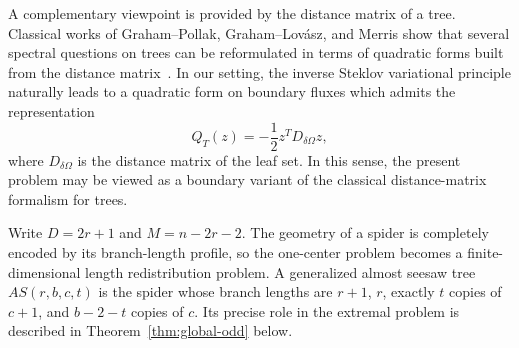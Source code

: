 \documentclass[11pt]{article}
\theoremstyle{remark}
\newcommand{\AS}{\mathrm{AS}}
\begin{document}
A complementary viewpoint is provided by the distance matrix of a tree. Classical works of
Graham--Pollak, Graham--Lov\'asz, and Merris show that several spectral questions on trees can be
reformulated in terms of quadratic forms built from the distance matrix~\cite{GrahamPollak1971,GrahamLovasz1978,Merris1990}. In our setting, the inverse Steklov
variational principle naturally leads to a quadratic form on boundary fluxes which admits the
representation
$$
Q_T(z)=-\frac12 z^T D_{\delta\Omega}z,
$$
where $D_{\delta\Omega}$ is the distance matrix of the leaf set. In this sense, the present problem
may be viewed as a boundary variant of the classical distance-matrix formalism for trees.

Write $D=2r+1$ and $M=n-2r-2$. The geometry of a spider is completely encoded by its branch-length
profile, so the one-center problem becomes a finite-dimensional length redistribution problem.
A generalized almost seesaw tree $AS(r,b,c,t)$ is the spider whose branch lengths are
$r+1$, $r$, exactly $t$ copies of $c+1$, and $b-2-t$ copies of $c$.
Its precise role in the extremal problem is described in Theorem~\ref{thm:global-odd} below.
\end{document}
